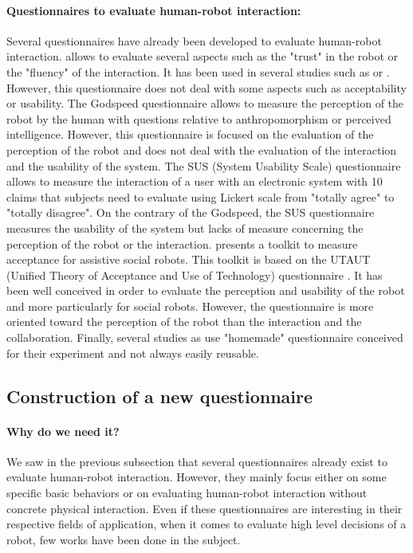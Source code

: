 \documentclass[english,a4paper,11pt,twoside]{StyleThese}
\begin{document}
\paragraph{Questionnaires to evaluate human-robot interaction:}

Several questionnaires have already been developed to evaluate human-robot interaction. \cite{hoffman2013evaluating} allows to evaluate several aspects such as the "trust" in the robot or the "fluency" of the interaction. It has been used in several studies such as \cite{gombolay2015decision} or \cite{dragan2015effects}. However, this questionnaire does not deal with some aspects such as acceptability or usability. The Godspeed questionnaire \cite{bartneck2009measurement} allows to measure the perception of the robot by the human with questions relative to anthropomorphism or perceived intelligence. However, this questionnaire is focused on the evaluation of the perception of the robot and does not deal with the evaluation of the interaction and the usability of the system. The SUS (System Usability Scale) questionnaire \cite{brooke1986system} allows to measure the interaction of a user with an electronic system with 10 claims that subjects need to evaluate using  Lickert scale from "totally agree" to "totally disagree". On the contrary of the Godspeed, the SUS questionnaire measures the usability of the system but lacks of measure concerning the perception of the robot or the interaction. \cite{heerink2009measuring} presents a toolkit to measure acceptance for assistive social robots. This toolkit is based on the UTAUT (Unified Theory of Acceptance and Use of Technology) questionnaire \cite{venkatesh2003user}. It has been well conceived in order to evaluate the perception and usability of the robot and more particularly for social robots. However, the questionnaire is more oriented toward the perception of the robot than the interaction and the collaboration. Finally, several studies as \cite{heerink2010relating,fischer2016between} use "homemade" questionnaire conceived for their experiment and not always easily reusable.

\subsection{Construction of a new questionnaire}


\paragraph{Why do we need it?}
We saw in the previous subsection that several questionnaires already exist to evaluate human-robot interaction. However, they mainly focus either on some specific basic behaviors or on evaluating human-robot interaction without concrete physical interaction. Even if these questionnaires are interesting in their respective fields of application, when it comes to evaluate high level decisions of a robot, few works have been done in the subject. 
\end{document}
